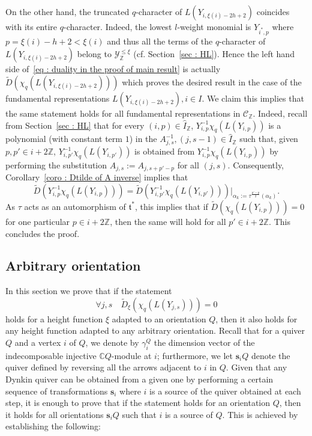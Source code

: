 \documentclass[12pt]{amsart}
\theoremstyle{plain}
\theoremstyle{definition}
\numberwithin{equation}{section}
\newcommand{\td}{{\widetilde{D}}}
\newcommand{\IZ}{\widehat{I}_{\mathbb{Z}}}
\newcommand{\tdxi}{\widetilde{D}_{\xi}}
\newcommand{\CZ}{\mathcal{C}_{\mathbb{Z}}}
\newcommand{\YxiZ}{\mathcal{Y}_{\mathbb{Z}}^{\leq \xi}}
\begin{document}
   On the other hand, the truncated $q$-character of $L(Y_{i, \xi(i)-2h+2})$ coincides with its entire $q$-character. Indeed, the lowest $l$-weight monomial is $Y_{i^{*},p}$ where $p = \xi(i)-h+2 < \xi(i)$ and thus all the terms of the $q$-character of $L(Y_{i, \xi(i)-2h+2})$ belong to $\YxiZ$ (cf. Section~\ref{sec : HL}). Hence the left hand side of~\eqref{eq : duality in the proof of main result} is actually $\td \left( \chi_q  \left( L(Y_{i, \xi(i)-2h+2}) \right) \right)$ which proves the desired result in the case of the fundamental representations $L(Y_{i, \xi(i)-2h+2}) , i \in I$. We claim this implies that the same statement holds for all fundamental representations in $\CZ$. Indeed, recall from Section~\ref{sec : HL} that for every $(i,p) \in \IZ$, $Y_{i,p}^{-1} \chi_q \left( L(Y_{i,p}) \right)$ is  a polynomial (with constant term $1$) in the $A_{j,s}^{-1} , (j,s-1) \in \IZ$ such that, given $p,p' \in i + 2 \mathbb{Z}$, $Y_{i,p'}^{-1} \chi_q \left( L(Y_{i,p'}) \right)$ is obtained from $Y_{i,p}^{-1} \chi_q \left( L(Y_{i,p}) \right)$ by performing the substitution $A_{j,s} := A_{j,s+p'-p}$ for all $(j,s)$. Consequently, Corollary~\ref{coro : Dtilde of A inverse} implies that 
  $$ \td \left(Y_{i,p}^{-1} \chi_q \left( L(Y_{i,p}) \right) \right) =\td \left(Y_{i,p'}^{-1} \chi_q \left( L(Y_{i,p'}) \right) \right) |_{\alpha_k := \tau^{ \frac{p'-p}{2}}(\alpha_k)}. $$
  As $\tau$ acts as an automorphism of $\mathfrak{t}^{*}$, this implies that if $\td \left(  \chi_q \left( L(Y_{i,p}) \right) \right)=0$ for one particular $p \in i + 2 \mathbb{Z}$, then the same will hold for all $p' \in i + 2 \mathbb{Z}$. This concludes the proof. 



 \subsection{Arbitrary orientation}

 In this section we prove that if the statement 
 $$ \forall j,s \quad \tdxi(\chi_q(L(Y_{j,s})))=0 $$
  holds for a height function $\xi$ adapted to an orientation $Q$, then  it also holds for any height function adapted to any arbitrary orientation. Recall that for a quiver $Q$ and a vertex $i$ of $Q$, we denote by $\gamma_i^{Q}$ the dimension vector of the indecomposable injective $\mathbb{C}Q$-module at $i$; furthermore, we let $\mathbf{s}_iQ$ denote the quiver  defined by reversing all the arrows adjacent to $i$ in $Q$.  Given that any Dynkin quiver can be obtained from a given one by performing a certain sequence of transformations $\mathbf{s}_i$ where $i$ is a source of the quiver obtained at each step, it is enough to prove that if the statement holds for an orientation $Q$, then it holds for all orientations $\mathbf{s}_iQ$ such that $i$ is a source of $Q$. This is achieved by establishing the following:
\end{document}
